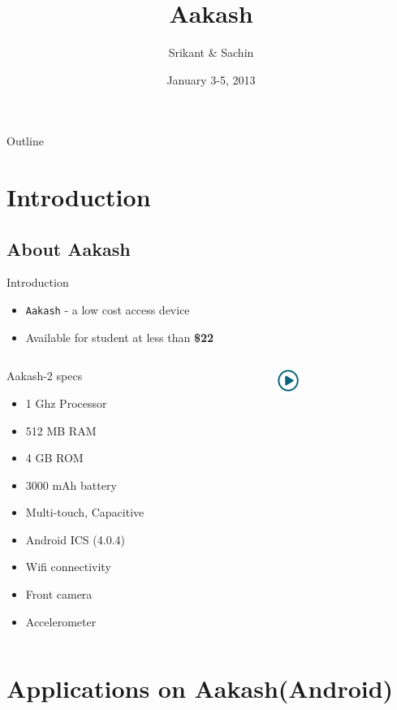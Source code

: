\documentclass{beamer}
\title[Aakash]{Aakash}
\author{Srikant \& Sachin}
\institute{Indian Institute of Technology, Bombay}
\date{January 3-5, 2013}
\begin{document}
\begin{frame}
  \titlepage
\end{frame}
\begin{frame}{Outline}
 \tableofcontents
\end{frame}
\section{Introduction}
\subsection{About Aakash}
\begin{frame}{Introduction}
\begin{itemize}
  \item {\tt Aakash} - a low cost access device
  \item Available for student at less than {\bf \$22}
\end{itemize}
\begin{columns}
\begin{column}{.48\textwidth}
\begin{block}{Aakash-2 specs}
\begin{itemize}
  \item 1 Ghz Processor
  \item 512 MB RAM
  \item 4 GB ROM
  \item 3000 mAh battery
  \item Multi-touch, Capacitive
  \item Android ICS (4.0.4) 
  \item Wifi connectivity
  \item Front camera
  \item Accelerometer
\end{itemize}
\end{block}
\end{column}%
\begin{column}{.20\textwidth}
  \centerline{\href{file:///opt/techfest2013/android_app.3gp}{\includegraphics[height=0.8cm,width=0.8cm]{play.jpg}}}
\end{column}%
\end{columns}
\end{frame}
\section{Applications on Aakash(Android)}
\end{document}
